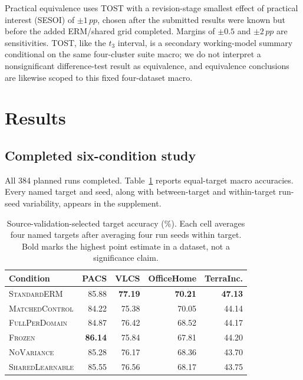 \documentclass[10pt]{article}
\newcommand{\pp}{\,pp}
\newcommand{\full}{\textsc{FullPerDomain}}
\newcommand{\erm}{\textsc{StandardERM}}
\newcommand{\shared}{\textsc{SharedLearnable}}
\newcommand{\novar}{\textsc{NoVariance}}
\begin{document}
Practical equivalence uses TOST \citep{schuirmann1987comparison} with a
revision-stage smallest effect of practical interest (SESOI) of $\pm1\pp$,
chosen after the submitted results were known but before the added ERM/shared
grid completed. Margins of $\pm0.5$ and $\pm2\pp$ are sensitivities. TOST,
like the $t_3$ interval, is a secondary working-model summary conditional on
the same four-cluster suite macro; we do not interpret a nonsignificant
difference-test result as equivalence, and equivalence conclusions are
likewise scoped to this fixed four-dataset macro.

\section{Results}
\label{sec:results}

\subsection{Completed six-condition study}

All 384 planned runs completed.
Table~\ref{tab:accuracy} reports equal-target macro accuracies. Every named
target and seed, along with between-target and within-target run-seed
variability, appears in the supplement.

\begin{table}[t]
\centering
\small
\caption{Source-validation-selected target accuracy (\%). Each cell averages
four named targets after averaging four run seeds within target. Bold marks
the highest point estimate in a dataset, not a significance claim.}
\label{tab:accuracy}
\begin{tabular}{lrrrr}
\toprule
Condition & PACS & VLCS & OfficeHome & TerraInc. \\
\midrule
\erm{}                 & 85.88 & \textbf{77.19} & \textbf{70.21} & \textbf{47.13} \\
\textsc{MatchedControl} & 84.22 & 75.38 & 70.05 & 44.14 \\
\full{}                & 84.87 & 76.42 & 68.52 & 44.17 \\
\textsc{Frozen}      & \textbf{86.14} & 75.84 & 67.81 & 44.20 \\
\novar{}               & 85.28 & 76.17 & 68.36 & 43.70 \\
\shared{}              & 85.55 & 76.56 & 68.17 & 43.75 \\
\bottomrule
\end{tabular}
\end{table}
\end{document}

